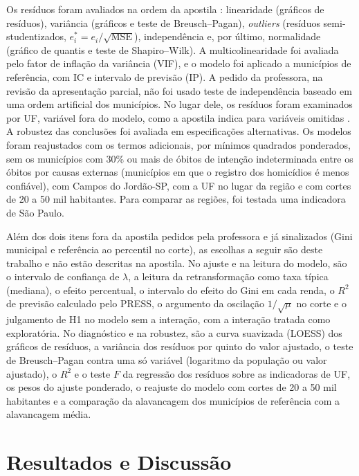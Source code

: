 \documentclass[a4paper,11pt]{article}
\begin{document}
Os resíduos foram avaliados na ordem da apostila \citep[cap.~4]{ferrari2023}: linearidade (gráficos de resíduos), variância (gráficos e teste de Breusch--Pagan), \textit{outliers} (resíduos semi-studentizados, $e_i^* = e_i/\sqrt{\text{MSE}}$), independência e, por último, normalidade (gráfico de quantis e teste de Shapiro--Wilk). A multicolinearidade foi avaliada pelo fator de inflação da variância (VIF), e o modelo foi aplicado a municípios de referência, com IC e intervalo de previsão (IP). A pedido da professora, na revisão da apresentação parcial, não foi usado teste de independência baseado em uma ordem artificial dos municípios. No lugar dele, os resíduos foram examinados por UF, variável fora do modelo, como a apostila indica para variáveis omitidas \citep[cap.~4]{ferrari2023}. A robustez das conclusões foi avaliada em especificações alternativas. Os modelos foram reajustados com os termos adicionais, por mínimos quadrados ponderados, sem os municípios com 30\% ou mais de óbitos de intenção indeterminada entre os óbitos por causas externas (municípios em que o registro dos homicídios é menos confiável), com Campos do Jordão-SP, com a UF no lugar da região e com cortes de 20 a 50 mil habitantes. Para comparar as regiões, foi testada uma indicadora de São Paulo.

Além dos dois itens fora da apostila pedidos pela professora e já sinalizados (Gini municipal e referência ao percentil no corte), as escolhas a seguir são deste trabalho e não estão descritas na apostila. No ajuste e na leitura do modelo, são o intervalo de confiança de $\lambda$, a leitura da retransformação como taxa típica (mediana), o efeito percentual, o intervalo do efeito do Gini em cada renda, o $R^2$ de previsão calculado pelo PRESS, o argumento da oscilação $1/\sqrt{\mu}$ no corte e o julgamento de H1 no modelo sem a interação, com a interação tratada como exploratória. No diagnóstico e na robustez, são a curva suavizada (LOESS) dos gráficos de resíduos, a variância dos resíduos por quinto do valor ajustado, o teste de Breusch--Pagan contra uma só variável (logaritmo da população ou valor ajustado), o $R^2$ e o teste $F$ da regressão dos resíduos sobre as indicadoras de UF, os pesos do ajuste ponderado, o reajuste do modelo com cortes de 20 a 50 mil habitantes e a comparação da alavancagem dos municípios de referência com a alavancagem média.


\section{Resultados e Discussão}
\end{document}
